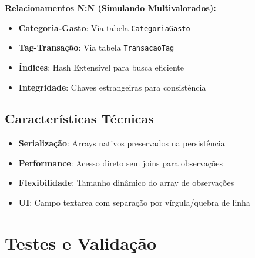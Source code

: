 \documentclass[12pt,a4paper]{article}
\begin{document}
\textbf{Relacionamentos N:N (Simulando Multivalorados):}
\begin{itemize}
  \item \textbf{Categoria-Gasto}: Via tabela \texttt{CategoriaGasto}
  \item \textbf{Tag-Transação}: Via tabela \texttt{TransacaoTag}
  \item \textbf{Índices}: Hash Extensível para busca eficiente
  \item \textbf{Integridade}: Chaves estrangeiras para consistência
\end{itemize}

\subsection{Características Técnicas}

\begin{itemize}
  \item \textbf{Serialização}: Arrays nativos preservados na persistência
  \item \textbf{Performance}: Acesso direto sem joins para observações
  \item \textbf{Flexibilidade}: Tamanho dinâmico do array de observações
  \item \textbf{UI}: Campo textarea com separação por vírgula/quebra de linha
\end{itemize}

\section{Testes e Validação}
\end{document}
